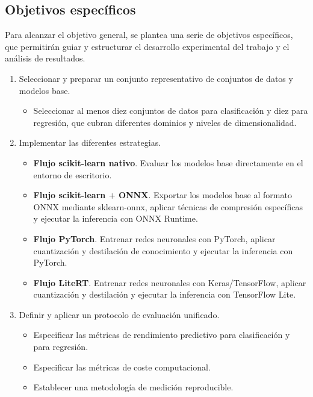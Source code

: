 \documentclass[a4paper,12pt,twoside,final]{book}
\begin{document}
\subsection{Objetivos específicos}
Para alcanzar el objetivo general, se plantea una serie de objetivos específicos, que permitirán guiar y estructurar
el desarrollo experimental del trabajo y el análisis de resultados.
\begin{enumerate}[label=\textbf{OE\arabic*}]
  \item Seleccionar y preparar un conjunto representativo de conjuntos de datos y modelos base.
  \begin{itemize}
    \item Seleccionar al menos diez conjuntos de datos para clasificación y diez para regresión, que cubran
    diferentes dominios y niveles de dimensionalidad.
  \end{itemize}

  \item Implementar las diferentes estrategias.
  \begin{itemize}
    \item \textbf{Flujo scikit-learn nativo}. Evaluar los modelos base directamente en el entorno de escritorio.
    \item \textbf{Flujo scikit-learn $+$ ONNX}. Exportar los modelos base al formato ONNX mediante sklearn-onnx,
    aplicar técnicas de compresión específicas y ejecutar la inferencia con ONNX Runtime.
    \item \textbf{Flujo PyTorch}. Entrenar redes neuronales con PyTorch, aplicar cuantización y destilación de
    conocimiento y ejecutar la inferencia
    con PyTorch.
    \item \textbf{Flujo LiteRT}. Entrenar redes neuronales con Keras/TensorFlow, aplicar cuantización y destilación y
    ejecutar la inferencia con TensorFlow Lite.
  \end{itemize}
  
  \item Definir y aplicar un protocolo de evaluación unificado.
  \begin{itemize}
    \item Especificar las métricas de rendimiento predictivo para clasificación y para regresión.
    \item Especificar las métricas de coste computacional.
    \item Establecer una metodología de medición reproducible.
  \end{itemize}


\end{enumerate}
\end{document}
